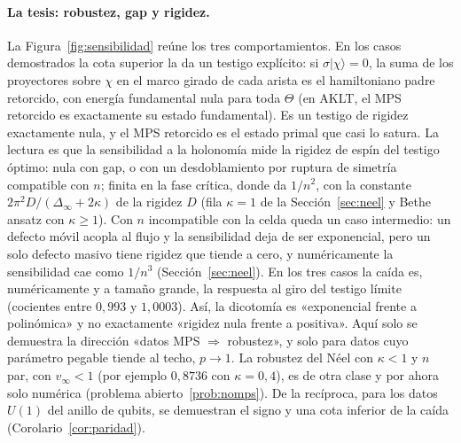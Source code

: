 \documentclass[11pt,a4paper]{article}
\theoremstyle{remark}
\newcommand{\ket}[1]{|#1\rangle}
\begin{document}
\paragraph{La tesis: robustez, gap y rigidez.} La Figura~\ref{fig:sensibilidad} reúne los tres comportamientos. En los casos demostrados la cota superior la da un
testigo explícito: si $\sigma\ket\chi=0$, la suma de los proyectores sobre $\chi$ en el marco girado
de cada arista es el hamiltoniano padre retorcido, con energía fundamental nula para toda
$\Theta$ (en AKLT, el MPS retorcido es exactamente su estado fundamental). Es un testigo de rigidez
exactamente nula, y el MPS retorcido es el estado primal que casi lo satura. La lectura es que la
sensibilidad a la holonomía mide la rigidez de espín del testigo óptimo: nula con gap, o con un
desdoblamiento por ruptura de simetría compatible con $n$; finita en la fase crítica, donde da
$1/n^2$, con la constante $2\pi^2D/(\Delta_\infty+2\kappa)$ de la rigidez $D$ (fila $\kappa=1$
de la Sección~\ref{sec:neel} y Bethe ansatz con $\kappa\ge1$). Con $n$ incompatible con la celda
queda un caso intermedio: un defecto móvil acopla al flujo y la sensibilidad deja de ser
exponencial, pero un solo defecto masivo tiene rigidez que tiende a cero, y numéricamente la
sensibilidad cae como $1/n^3$ (Sección~\ref{sec:neel}). En los tres casos la caída es, numéricamente y a tamaño
grande, la respuesta al giro del testigo límite (cocientes entre $0{,}993$ y $1{,}0003$). Así, la dicotomía es «exponencial frente a
polinómica» y no exactamente «rigidez nula frente a positiva». Aquí solo se demuestra la dirección
«datos MPS $\Rightarrow$ robustez», y solo para datos cuyo parámetro pegable tiende al techo,
$p\to1$. La robustez del Néel con $\kappa<1$ y $n$ par, con $v_\infty<1$ (por ejemplo
$0{,}8736$ con $\kappa=0{,}4$), es de otra clase y por ahora solo numérica (problema abierto~\ref{prob:nomps}). De la recíproca, para los datos $U(1)$ del anillo de qubits,
se demuestran el signo y una cota inferior de la caída (Corolario~\ref{cor:paridad}).
\end{document}
